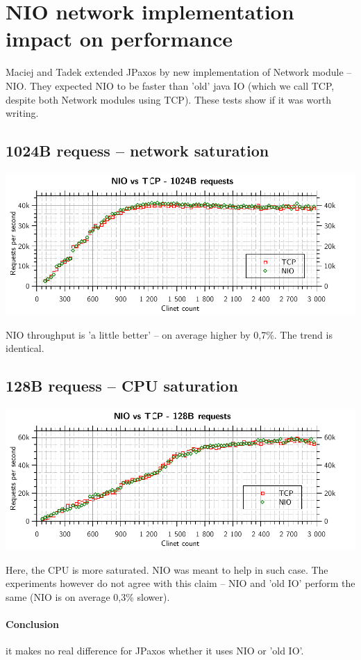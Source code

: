 
\section{NIO network implementation impact on performance}

Maciej and Tadek extended JPaxos by new implementation of Network module -- NIO. They expected NIO to be faster than 'old' java IO (which we call TCP, despite both Network modules using TCP). These tests show if it was worth writing.

\subsection{1024B requess -- network saturation}

\includegraphics{tcp_nio/tcp_nio_1024}

NIO throughput is 'a little better' -- on average higher by 0,7\%. The trend is identical.

\subsection{128B requess -- CPU saturation}

\includegraphics{tcp_nio/tcp_nio_128}

Here, the CPU is more saturated. NIO was meant to help in such case. The experiments however do not agree with this claim -- NIO and 'old IO' perform the same (NIO is on average 0,3\% slower).

\paragraph{Conclusion} it makes no real difference for JPaxos whether it uses NIO or 'old IO'.